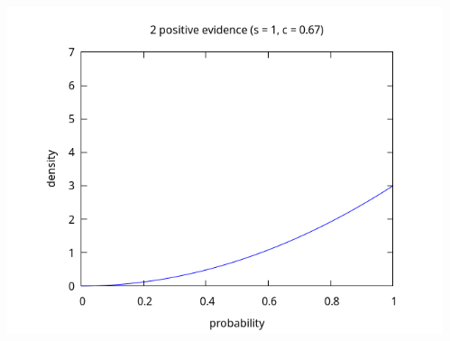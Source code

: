 \documentclass[aspectratio=169]{beamer}
\begin{document}
\begin{frame}
\begin{columns}
\begin{center}
    \end{center}
    \begin{center}
      \includegraphics[scale=0.2]{figs/observations_0_2.png}
    \end{center}
  \end{columns}
\end{frame}
\end{document}
